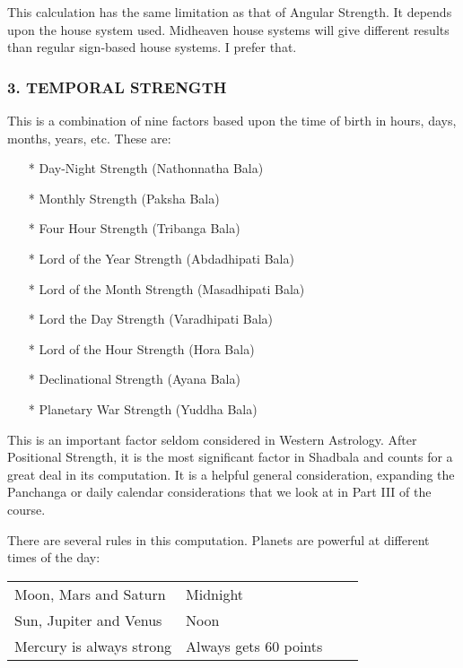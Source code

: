 This calculation has the same limitation as that of Angular Strength. It depends upon the house system used. Midheaven house systems will give different results than regular sign-based house systems. I prefer that.

 


\subsubsection{3. TEMPORAL STRENGTH}
 

This is a combination of nine factors based upon the time of birth in hours, days, months, years, etc.   These are:

 

\begin{enumerate}
\item[*] Day-Night Strength (Nathonnatha Bala)
\item[*] Monthly Strength (Paksha Bala)
\item[*] Four Hour Strength (Tribanga Bala)
\item[*] Lord of the Year Strength (Abdadhipati Bala)
\item[*] Lord of the Month Strength (Masadhipati Bala)
\item[*] Lord the Day Strength (Varadhipati Bala)
\item[*] Lord of the Hour Strength (Hora Bala)
\item[*] Declinational Strength (Ayana Bala)
\item[*] Planetary War Strength (Yuddha Bala)
 \end{enumerate}

This is an important factor seldom considered in Western Astrology. After Positional Strength, it is the most significant factor in Shadbala and counts for a great deal in its computation. It is a helpful general consideration, expanding the Panchanga or daily calendar considerations that we look at in Part III of the course.

 


 

There are several rules in this computation. Planets are powerful at different times of the day:

 
\begin{center}
\begin{tabular}{ l l l l}
Moon, Mars and Saturn	 & Midnight           \\
Sun, Jupiter and Venus	  &Noon           \\
Mercury is always strong	  &Always gets 60 points           \\
   \end{tabular}
\end{center}

